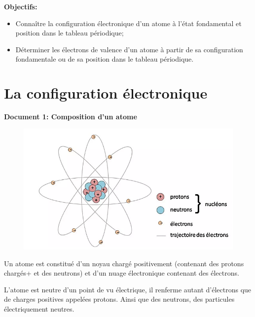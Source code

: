 \documentclass[french]{article}
\begin{document}
\noindent\textbf{Objectifs:}
\begin{itemize}
	\item Connaître la configuration électronique d'un atome à l'état fondamental et position dans le tableau périodique;
	\item Déterminer les électrons de valence d'un atome à partir de sa configuration fondamentale ou de sa position dans le tableau périodique.
\end{itemize}

\section{La configuration électronique}
	\begin{mdframed}[style=doc, leftmargin=0cm, rightmargin=0cm, innertopmargin=8pt, innerbottommargin=8pt, innerrightmargin=10pt, innerleftmargin=10pt]
		\noindent \textbf{Document 1: Composition d'un atome}\bigskip
		
		\begin{figure}
			\centering
			\vspace{-1cm}
			\includegraphics*[width=.4\textwidth]{SchemaAtome.png}
		\end{figure}

		Un atome est constitué d'un noyau chargé positivement (contenant des protons chargés+ et des neutrons)  et d'un nuage électronique contenant des électrons.\medskip
		
		L'atome est neutre d'un point de vu électrique, il renferme autant d'électrons que de charges positives appelées protons. Ainsi que des neutrons, des particules électriquement neutres.

	\end{mdframed}
\end{document}
